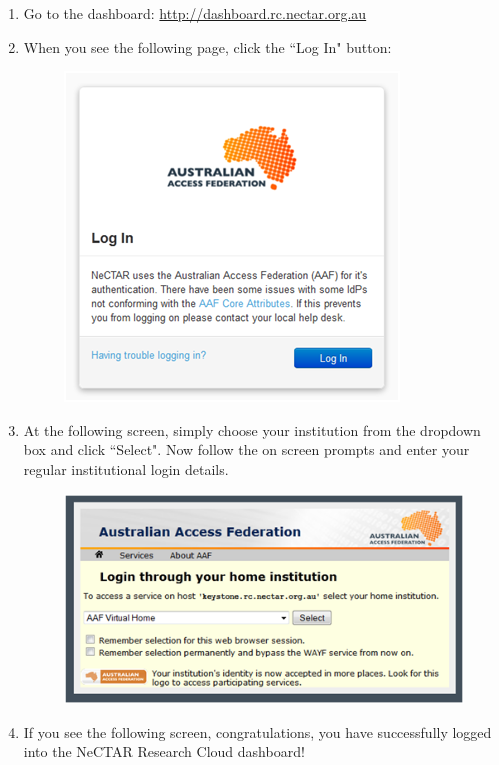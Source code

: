 \begin{enumerate}
  \item Go to the dashboard: \url{http://dashboard.rc.nectar.org.au}
  \item When you see the following page, click the ``Log In" button:
  \begin{figure}[H]
    \centering
    \includegraphics[scale=0.5]{handout/nectar/aaf_login.png}
    \caption{\label{fig:aaf_login}}
  \end{figure}
  \item At the following screen, simply choose your institution from the
  dropdown box and click ``Select". Now follow the on screen prompts and enter
  your regular institutional login details.
  \begin{figure}[H]
    \centering
    \includegraphics[scale=0.5]{handout/nectar/aaf_home_institute.png}
    \caption{\label{fig:aaf_home_institute}}
  \end{figure}
  \item If you see the following screen, congratulations, you have
  successfully logged into the NeCTAR Research Cloud dashboard!

\end{enumerate}
